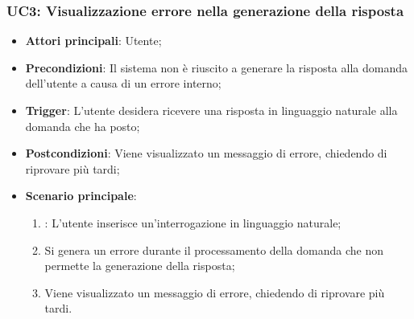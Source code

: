 \hypertarget{UC3}{}
\subsubsection{UC3: Visualizzazione errore nella generazione della risposta}
\begin{itemize}
    \item \textbf{Attori principali}: Utente;
    \item \textbf{Precondizioni}: Il sistema non è riuscito a generare la risposta alla domanda dell'utente a causa di un errore interno;
    \item \textbf{Trigger}: L'utente desidera ricevere una risposta in linguaggio naturale alla domanda che ha posto;
    \item \textbf{Postcondizioni}: Viene visualizzato un messaggio di errore, chiedendo di riprovare più tardi;
    \item \textbf{Scenario principale}:
    \begin{enumerate}
        \item {}: L'utente inserisce un'interrogazione in linguaggio naturale;
        \item Si genera un errore durante il processamento della domanda che non permette la generazione della risposta;
        \item Viene visualizzato un messaggio di errore, chiedendo di riprovare più tardi.
    \end{enumerate}
\end{itemize}

\hypertarget{UC4}{}
